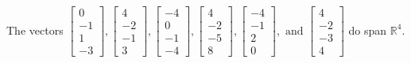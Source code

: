 \begin{exercise}
\begin{exerciseStatement}
  \end{exerciseStatement}
  \begin{exerciseAnswer}
   The vectors \(\left[\begin{array}{r}
0 \\
-1 \\
1 \\
-3
\end{array}\right] , \left[\begin{array}{r}
4 \\
-2 \\
-1 \\
3
\end{array}\right] , \left[\begin{array}{r}
-4 \\
0 \\
-1 \\
-4
\end{array}\right] , \left[\begin{array}{r}
4 \\
-2 \\
-5 \\
8
\end{array}\right] , \left[\begin{array}{r}
-4 \\
-1 \\
2 \\
0
\end{array}\right] , \text{ and } \left[\begin{array}{r}
4 \\
-2 \\
-3 \\
4
\end{array}\right]\) 
  	 do  
	span \(\mathbb{R}^4\).
  


  \end{exerciseAnswer}
\end{exercise}